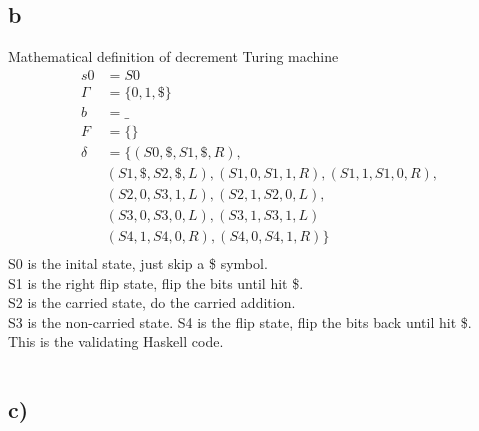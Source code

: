 \documentclass{article}
\begin{document}
\subsection*{b}
Mathematical definition of decrement Turing machine 
\begin{align*}
    s0 &= S0 \\
    \Gamma &= \{ 0, 1, \$ \} \\
    b &= \_ \\
    F &= \{ \} \\
    \delta &= \{ (S0, \$, S1, \$, R), \\
    &(S1, \$, S2, \$, L), (S1, 0, S1, 1, R), (S1, 1, S1, 0, R), \\
    &(S2, 0, S3, 1, L), (S2, 1, S2, 0, L), \\
    &(S3, 0, S3, 0, L), (S3, 1, S3, 1, L) \\
    &(S4, 1, S4, 0, R), (S4, 0, S4, 1, R) \} \\
\end{align*}
S0 is the inital state, just skip a \$ symbol. \\
S1 is the right flip state, flip the bits until hit \$. \\
S2 is the carried state, do the carried addition. \\
S3 is the non-carried state.
S4 is the flip state, flip the bits back until hit \$. \\

This is the validating Haskell code. 
\inputminted{Haskell}{turing_dec.hs}

\subsection*{c)}
\end{document}
